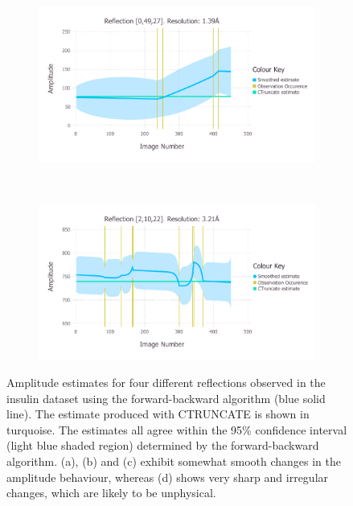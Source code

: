 \begin{figure}
    \ContinuedFloat
    \begin{subfigure}[b]{1.0\textwidth}
        \centering
        \includegraphics[width=\textwidth]{figures/datared/SmoothedPlot_0,49,27_res1.pdf}
        \caption{}
        \label{fig:Amplitude estimates ref 0,49,27 - insulin}
    \end{subfigure}
    \\
    \begin{subfigure}[b]{1.0\textwidth}
        \centering
        \includegraphics[width=\textwidth]{figures/datared/SmoothedPlot_2,10,22_res3.pdf}
        \caption{}
        \label{fig:Amplitude estimates ref 2,10,22 - insulin}
    \end{subfigure}
    \caption{Amplitude estimates for four different reflections observed in the insulin dataset using the forward-backward algorithm (blue solid line).
    The estimate produced with CTRUNCATE is shown in turquoise.
    The estimates all agree within the 95\% confidence interval (light blue shaded region) determined by the forward-backward algorithm.
    (a), (b) and (c) exhibit somewhat smooth changes in the amplitude behaviour, whereas (d) shows very sharp and irregular changes, which are likely to be unphysical.}
    \label{fig:Amplitude estimates - insulin}
\end{figure}

